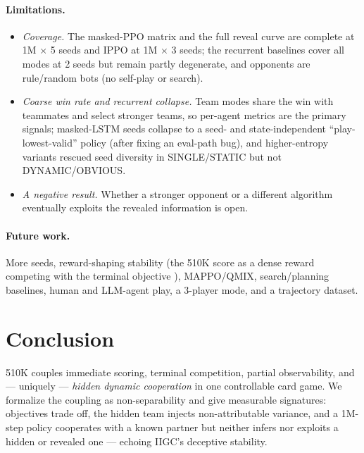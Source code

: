\documentclass{article}
\begin{document}
\paragraph{Limitations.}
\begin{itemize}
\item \emph{Coverage.} The masked-PPO matrix and the full reveal curve are
complete at 1M $\times$ 5 seeds and IPPO at 1M $\times$ 3 seeds; the recurrent
baselines cover all modes at 2 seeds but remain partly degenerate, and opponents
are rule/random bots (no self-play or search).
\item \emph{Coarse win rate and recurrent collapse.} Team modes share the win
with teammates and select stronger teams, so per-agent metrics are the primary
signals; masked-LSTM seeds collapse to a seed- and state-independent
``play-lowest-valid'' policy (after fixing an eval-path bug), and higher-entropy
variants rescued seed diversity in SINGLE/STATIC but not DYNAMIC/OBVIOUS.
\item \emph{A negative result.} Whether a stronger opponent or a different
algorithm eventually exploits the revealed information is open.
\end{itemize}

\paragraph{Future work.} More seeds, reward-shaping stability (the 510K score
as a dense reward competing with the terminal objective \citep{ng,skalse}),
MAPPO/QMIX, search/planning baselines, human and LLM-agent play, a 3-player
mode, and a trajectory dataset.

\section{Conclusion}
510K couples immediate scoring, terminal competition, partial observability, and
--- uniquely --- \emph{hidden dynamic cooperation} in one controllable card game.
We formalize the coupling as non-separability and give measurable signatures:
objectives trade off, the hidden team injects non-attributable variance, and a
1M-step policy cooperates with a known partner but neither infers nor exploits a
hidden or revealed one --- echoing IIGC's deceptive stability.

\label{maintextend}
\end{document}
